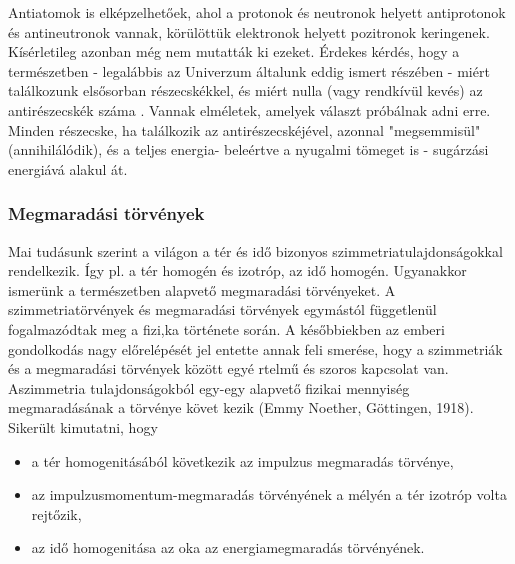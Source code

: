 \documentclass[../main.tex]{subfiles}
\begin{document}
Antiatomok is elképzelhetőek, ahol a protonok és neutronok helyett antiprotonok és antineutronok vannak, körülöttük elektronok helyett pozitronok keringenek. Kísérletileg azonban még nem mutatták ki ezeket. Érdekes
kérdés, hogy a természetben - legalábbis az Univerzum általunk eddig ismert részében - miért találkozunk elsősorban részecskékkel, és miért nulla
(vagy rendkívül kevés) az antirészecskék száma . Vannak elméletek, amelyek
választ próbálnak adni erre. Minden részecske, ha találkozik az antirészecskéjével, azonnal "megsemmisül" (annihilálódik), és a teljes energia- beleértve a nyugalmi tömeget is - sugárzási energiává alakul át.

\subsubsection*{Megmaradási törvények}
Mai tudásunk szerint a világon a tér és idő bizonyos szimmetriatulajdonságokkal rendelkezik. Így pl. a tér homogén és izotróp, az idő homogén.
Ugyanakkor ismerünk a természetben alapvető megmaradási törvényeket.
A szimmetriatörvények és megmaradási törvények egymástól függetlenül fogalmazódtak meg a fizi,ka története során. A későbbiekben az emberi gondolkodás nagy előrelépését jel entette annak feli smerése,
hogy a szimmetriák és a megmaradási törvények között egyé rtelmű és szoros kapcsolat van.
Aszimmetria tulajdonságokból egy-egy alapvető fizikai mennyiség megmaradásának a törvénye követ kezik (Emmy Noether, Göttingen, 1918). Sikerült kimutatni, hogy
\begin{itemize}
    \item a tér homogenitásából következik az impulzus megmaradás törvénye,
    \item az impulzusmomentum-megmaradás törvényének a mélyén a tér izotróp volta rejtőzik,
    \item az idő homogenitása az oka az energiamegmaradás törvényének.
\end{itemize}
\end{document}
